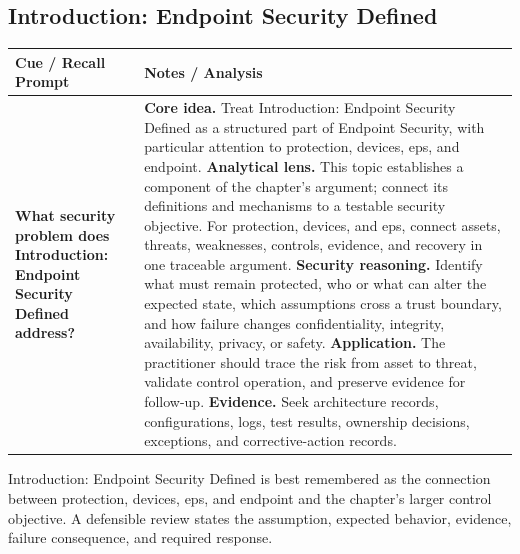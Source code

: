 \documentclass[11pt]{article}
\newcommand{\CornellHeader}{%
\rowcolor{Navy}\color{white}\bfseries Cue / Recall Prompt & \color{white}\bfseries Notes / Analysis\\\hline}
\newcommand{\CornellRow}[2]{%
\cellcolor{CueGray}\RaggedRight\textbf{#1} & \RaggedRight #2\\\hline}
\begin{document}
\subsection*{Introduction: Endpoint Security Defined}
\begin{longtable}{>{\RaggedRight\arraybackslash}p{}|>{\RaggedRight\arraybackslash}p{}}
\CornellHeader
\CornellRow{What security problem does Introduction: Endpoint Security Defined address?}{\textbf{Core idea.} Treat Introduction: Endpoint Security Defined as a structured part of Endpoint Security, with particular attention to protection, devices, eps, and endpoint. \textbf{Analytical lens.} This topic establishes a component of the chapter's argument; connect its definitions and mechanisms to a testable security objective. For protection, devices, and eps, connect assets, threats, weaknesses, controls, evidence, and recovery in one traceable argument. \textbf{Security reasoning.} Identify what must remain protected, who or what can alter the expected state, which assumptions cross a trust boundary, and how failure changes confidentiality, integrity, availability, privacy, or safety. \textbf{Application.} The practitioner should trace the risk from asset to threat, validate control operation, and preserve evidence for follow-up. \textbf{Evidence.} Seek architecture records, configurations, logs, test results, ownership decisions, exceptions, and corrective-action records.}
\end{longtable}
\begin{topicsummary}
Introduction: Endpoint Security Defined is best remembered as the connection between protection, devices, eps, and endpoint and the chapter's larger control objective. A defensible review states the assumption, expected behavior, evidence, failure consequence, and required response.
\end{topicsummary}
\end{document}
